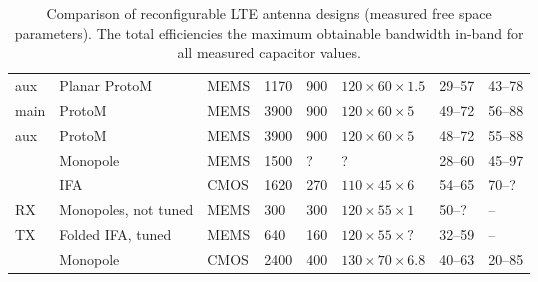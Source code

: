 \begin{table}[htbp]
\begin{tabularx}{\linewidth}{p{21mm}Xk{13mm}k{17mm}k{13mm}k{20mm}k{17mm}k{17mm}}
        \cite{ilvonen2014multiband} aux      & Planar ProtoM               & MEMS     & 1170   & 900   & $120\times60\times1.5$   & 29--57 & 43--78   \\
        \cite{ilvonen2014multiband} main     & ProtoM                      & MEMS     & 3900   & 900   & $120\times60\times5$     & 49--72 & 56--88   \\
        \cite{ilvonen2014multiband} aux      & ProtoM                      & MEMS     & 3900   & 900   & $120\times60\times5$     & 48--72 & 55--88   \\
        \cite{morris2014tunable}             & Monopole                    & MEMS     & 1500   & ?     & ?                        & 28--60 & 45--97   \\
        \cite{xia2015compact}                & IFA                         & CMOS     & 1620   & 270   & $110\times45\times6$     & 54--65 & 70--?    \\
        \cite{tatomirescu2015alternative} RX & Monopoles, not tuned        & MEMS     & 300    & 300   & $120\times55\times1$     & 50--?  & --       \\
        \cite{tatomirescu2015alternative} TX & Folded IFA, tuned           & MEMS     & 640    & 160   & $120\times55\times?$     & 32--59 & --       \\
        \cite{trinh2016reconfigurable}       & Monopole                    & CMOS     & 2400   & 400   & $130\times70\times6.8$   & 40--63 & 20--85   \\
        \bottomrule
    \end{tabularx}
    \caption{Comparison of reconfigurable LTE antenna designs (measured free space parameters). The total efficiencies the maximum obtainable bandwidth in-band for all measured capacitor values.}
    \label{tab:comparison_reconf_lte}
\end{table}

% 
% 
% 



